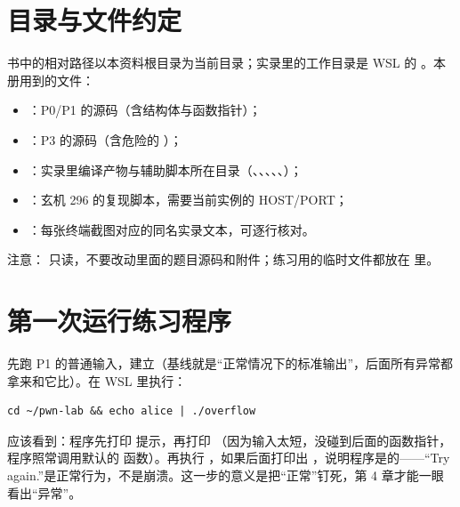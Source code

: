 \documentclass[UTF8,12pt,oneside]{ctexbook}
\begin{document}

\section{目录与文件约定}
书中的相对路径以本资料根目录为当前目录；实录里的工作目录是 WSL 的 。本册用到的文件：
\begin{itemize}
\item {}：P0/P1 的源码（含结构体与函数指针）；
\item {}：P3 的源码（含危险的 ）；
\item {}：实录里编译产物与辅助脚本所在目录（、、、、、）；
\item {}：玄机 296 的复现脚本，需要当前实例的 HOST/PORT；
\item {}：每张终端截图对应的同名实录文本，可逐行核对。
\end{itemize}
注意： 只读，不要改动里面的题目源码和附件；练习用的临时文件都放在  里。

\section{第一次运行练习程序}
先跑 P1 的普通输入，建立（基线就是“正常情况下的标准输出”，后面所有异常都拿来和它比）。在 WSL 里执行：
\begin{lstlisting}
cd ~/pwn-lab && echo alice | ./overflow
\end{lstlisting}
应该看到：程序先打印  提示，再打印 （因为输入太短，没碰到后面的函数指针，程序照常调用默认的  函数）。再执行 ，如果后面打印出 ，说明程序是的——“Try again.”是正常行为，不是崩溃。这一步的意义是把“正常”钉死，第 4 章才能一眼看出“异常”。

\end{document}
